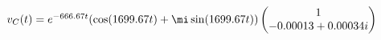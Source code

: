 \documentclass[preview]{standalone}
\begin{document}
\begin{center}
$v_C(t) = e^{-666.67t}(\cos(1699.67t) + \mi \sin(1699.67t)) \begin{pmatrix} 1 \\ -0.00013 + 0.00034i \end{pmatrix}$
\end{center}
\end{document}
